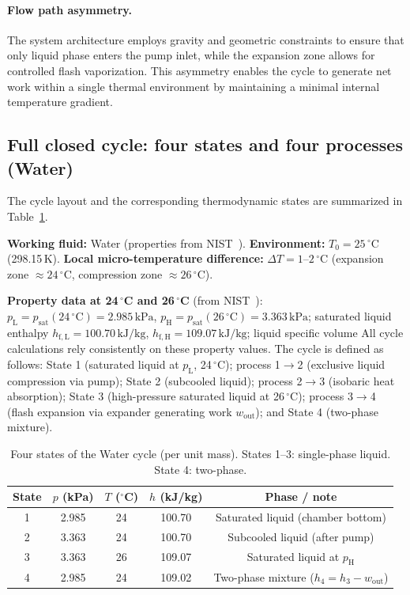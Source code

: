 \documentclass[11pt,a4paper]{article}
\begin{document}
\paragraph{Flow path asymmetry.}
The system architecture employs gravity and geometric constraints to 
ensure that only liquid phase enters the pump inlet, while the expansion 
zone allows for controlled flash vaporization. This asymmetry enables 
the cycle to generate net work within a single thermal environment by 
maintaining a minimal internal temperature gradient.

\subsection{Full closed cycle: four states and four processes (Water)}
\label{sec:four_state_cycle}

The cycle layout and the corresponding thermodynamic states are summarized in 
Table~\ref{tab:states}.

\textbf{Working fluid:} Water (properties from NIST~\cite{nistwebbook}). 
\textbf{Environment:} $T_0 = 25\,^\circ\mathrm{C}$ (298.15\,K). 
\textbf{Local micro-temperature difference:} $\Delta T = 1$--$2\,^\circ\mathrm{C}$
(expansion zone $\approx 24\,^\circ\mathrm{C}$, compression zone $\approx 26\,^\circ\mathrm{C}$).

\textbf{Property data at 24\,$^\circ$C and 26\,$^\circ$C} (from
NIST~\cite{nistwebbook}): $p_{\mathrm{L}} = p_{\mathrm{sat}}(24\,^\circ\mathrm{C})
= 2.985\,\mathrm{kPa}$, $p_{\mathrm{H}} = p_{\mathrm{sat}}(26\,^\circ\mathrm{C})
= 3.363\,\mathrm{kPa}$; saturated liquid enthalpy
$h_{\mathrm{f,L}} = 100.70\,\mathrm{kJ}/\mathrm{kg}$,
$h_{\mathrm{f,H}} = 109.07\,\mathrm{kJ}/\mathrm{kg}$; liquid specific volume
All cycle calculations rely consistently on these property values. The 
cycle is defined as follows: State 1 (saturated liquid at $p_{\mathrm{L}}$, 
24\,$^\circ$C); process 1$\to$2 (exclusive liquid compression via 
pump); State 2 (subcooled liquid); process 2$\to$3 (isobaric heat 
absorption); State 3 (high-pressure saturated liquid at 26\,$^\circ$C); 
process 3$\to$4 (flash expansion via expander generating work $w_{\mathrm{out}}$); 
and State 4 (two-phase mixture).

\begin{table}[htbp]
\centering
\caption{Four states of the Water cycle (per unit mass). States 1--3: single-phase liquid. State 4: two-phase.}
\label{tab:states}
\small
\begin{tabular}{@{}ccccc@{}}
\toprule
State & $p$ (kPa) & $T$ ($^\circ$C) & $h$ (kJ/kg) & Phase / note \\
\midrule
1 & 2.985 & 24 & 100.70 & Saturated liquid (chamber bottom) \\
2 & 3.363 & 24 & 100.70 & Subcooled liquid (after pump) \\
3 & 3.363 & 26 & 109.07 & Saturated liquid at $p_{\mathrm{H}}$ \\
4 & 2.985 & 24 & 109.02 & Two-phase mixture ($h_4 = h_3 - w_{\mathrm{out}}$) \\
\bottomrule
\end{tabular}
\end{table}
\end{document}
